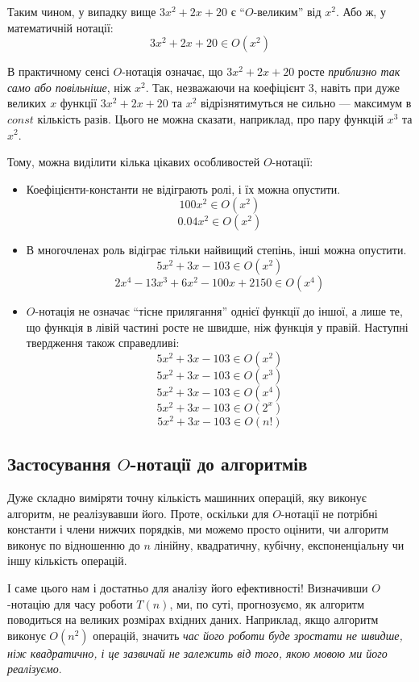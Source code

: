 \documentclass[12pt,a4paper]{report}
\begin{document}
Таким чином, у випадку вище \(3x^2 + 2x + 20\) є ``\(O\)-великим'' від \(x^2\).
Або ж, у математичній нотації:
\[3x^2 + 2x + 20 \in O(x^2)\]

В практичному сенсі \(O\)-нотація означає, що \(3x^2 + 2x + 20\) росте \emph{приблизно так само або повільніше}, ніж \(x^2\).
Так, незважаючи на коефіцієнт \(3\), навіть при дуже великих \(x\) функції \(3x^2 + 2x + 20\) та \(x^2\) відрізнятимуться не сильно --- максимум в \(const\) кількість разів. Цього не можна сказати, наприклад, про пару функцій \(x^3\) та \(x^2\).

Тому, можна виділити кілька цікавих особливостей \(O\)-нотації:
\begin{itemize}
    \item Коефіцієнти-константи не відіграють ролі, і їх можна опустити.
        \[100x^2 \in O(x^2)\]
        \[0.04x^2 \in O(x^2)\]
    \item В многочленах роль відіграє тільки найвищий степінь, інші можна опустити.
        \[5x^2 + 3x - 103 \in O(x^2)\]
        \[2x^4 - 13x^3 + 6x^2 - 100x + 2150 \in O(x^4)\]
    \item \(O\)-нотація не означає ``тісне прилягання'' однієї функції до іншої, а лише те, що функція в лівій частині росте не швидше, ніж функція у правій. Наступні твердження також справедливі:
        \[5x^2 + 3x - 103 \in O(x^2)\]
        \[5x^2 + 3x - 103 \in O(x^3)\]
        \[5x^2 + 3x - 103 \in O(x^4)\]
        \[5x^2 + 3x - 103 \in O(2^x)\]
        \[5x^2 + 3x - 103 \in O(n!)\]

\end{itemize}


\subsection*{Застосування \(O\)-нотації до алгоритмів}

Дуже складно виміряти точну кількість машинних операцій, яку виконує алгоритм, не реалізувавши його.
Проте, оскільки для \(O\)-нотації не потрібні константи і члени нижчих порядків, ми можемо просто оцінити, чи алгоритм виконує по відношенню до \(n\) лінійну, квадратичну, кубічну, експоненціальну чи іншу кількість операцій.

І саме цього нам і достатньо для аналізу його ефективності!
Визначивши \(O\)-нотацію для часу роботи \(T(n)\), ми, по суті, прогнозуємо, як алгоритм поводиться на великих розмірах вхідних даних.
Наприклад, якщо алгоритм виконує \(O(n^2)\) операцій, значить \emph{час його роботи буде зростати не швидше, ніж квадратично, і це зазвичай не залежить від того, якою мовою ми його реалізуємо}.
\end{document}
